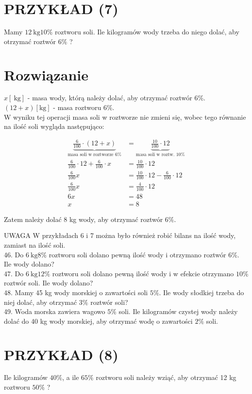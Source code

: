 \documentclass[10pt]{article}
\begin{document}
\section*{PRZYKŁAD (7)}
Mamy \(12 \mathrm{~kg} 10 \%\) roztworu soli. Ile kilogramów wody trzeba do niego dolać, aby otrzymać roztwór \(6 \%\) ?

\section*{Rozwiązanie}
\(x[\mathrm{~kg}]\) - masa wody, którą należy dolać, aby otrzymać roztwór \(6 \%\).\\
\((12+x)[\mathrm{kg}]\) - masa roztworu \(6 \%\).\\
W wyniku tej operacji masa soli w roztworze nie zmieni się, wobec tego równanie na ilość soli wygląda następująco:

\[
\begin{aligned}
\underbrace{\frac{6}{100} \cdot(12+x)}_{\text {masa soli w roztworze } 6 \%} & =\underbrace{\frac{10}{100} \cdot 12}_{\text {masa soli w roztw. } 10 \%} \\
\frac{6}{100} \cdot 12+\frac{6}{100} \cdot x & =\frac{10}{100} \cdot 12 \\
\frac{6}{100} x & =\frac{10}{100} \cdot 12-\frac{6}{100} \cdot 12 \\
\frac{6}{100} x & =\frac{4}{100} \cdot 12 \\
6 x & =48 \\
x & =8
\end{aligned}
\]

Zatem należy dolać 8 kg wody, aby otrzymać roztwór \(6 \%\).

UWAGA W przykładach 6 i 7 można było również robić bilans na ilość wody, zamiast na ilość soli.\\
46. Do \(6 \mathrm{~kg} 8 \%\) roztworu soli dolano pewną ilość wody i otrzymano roztwór \(6 \%\). Ile wody dolano?\\
47. Do \(6 \mathrm{~kg} 12 \%\) roztworu soli dolano pewną ilość wody i w efekcie otrzymano \(10 \%\) roztwór soli. Ile wody dolano?\\
48. Mamy 45 kg wody morskiej o zawartości soli \(5 \%\). Ile wody słodkiej trzeba do niej dolać, aby otrzymać \(3 \%\) roztwór soli?\\
49. Woda morska zawiera wagowo \(5 \%\) soli. Ile kilogramów czystej wody należy dolać do 40 kg wody morskiej, aby otrzymać wodę o zawartości \(2 \%\) soli.

\section*{PRZYKŁAD (8)}
Ile kilogramów \(40 \%\), a ile \(65 \%\) roztworu soli należy wziąć, aby otrzymać 12 kg roztworu \(50 \%\) ?
\end{document}
